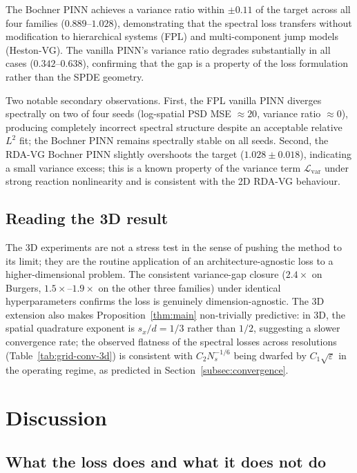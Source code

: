 \documentclass[review,12pt]{elsarticle}
\begin{document}
The Bochner PINN achieves a variance ratio within
\(\pm 0.11\) of the target across all four families
(\(0.889\)--\(1.028\)), demonstrating that the spectral loss transfers
without modification to hierarchical systems (FPL) and multi-component
jump models (Heston-VG). The vanilla PINN's variance ratio degrades
substantially in all cases (\(0.342\)--\(0.638\)), confirming that the
gap is a property of the loss formulation rather than the SPDE
geometry.

Two notable secondary observations. First, the FPL vanilla PINN
diverges spectrally on two of four seeds (log-spatial PSD MSE
\(\approx 20\), variance ratio \(\approx 0\)), producing completely
incorrect spectral structure despite an acceptable relative \(L^2\)
fit; the Bochner PINN remains spectrally stable on all seeds.
Second, the RDA-VG Bochner PINN slightly overshoots the target
(\(1.028 \pm 0.018\)), indicating a small variance excess; this is
a known property of the variance term \(\mathcal{L}_{\mathrm{var}}\)
under strong reaction nonlinearity and is consistent with the 2D
RDA-VG behaviour.

\subsection{Reading the 3D result}

The 3D experiments are not a stress test in the sense of pushing the
method to its limit; they are the routine application of an
architecture-agnostic loss to a higher-dimensional problem.
The consistent variance-gap closure (\(2.4\times\) on Burgers,
\(1.5\times\)--\(1.9\times\) on the other three families) under
identical hyperparameters confirms the loss is genuinely
dimension-agnostic. The 3D extension also makes
Proposition~\ref{thm:main} non-trivially predictive: in 3D, the
spatial quadrature exponent is \(s_x/d = 1/3\) rather than \(1/2\),
suggesting a slower convergence rate; the observed flatness of the
spectral losses across resolutions
(Table~\ref{tab:grid-conv-3d}) is consistent with \(C_2 N_s^{-1/6}\)
being dwarfed by \(C_1\sqrt\varepsilon\) in the operating regime, as
predicted in Section~\ref{subsec:convergence}.

\section{Discussion}
\label{sec:discussion}

\subsection{What the loss does and what it does not do}
\end{document}
